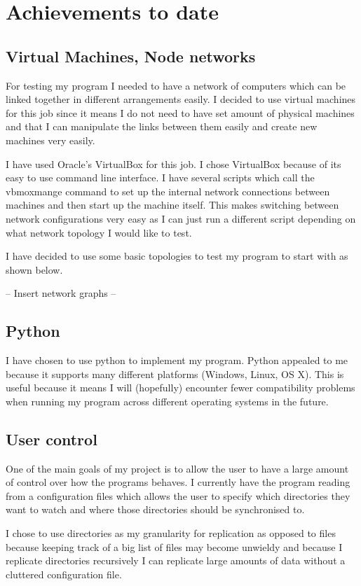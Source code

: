 \documentclass[12pt]{article}
\begin{document}
\section{Achievements to date}
\subsection{Virtual Machines, Node networks}
For testing my program I needed to have a network
of computers which can be linked together in different
arrangements easily. I decided to use virtual machines for
this job since it means I do not need to have set amount
of physical machines and that I can manipulate the
links between them easily and create new machines very easily. 

I have used Oracle's VirtualBox for this job. I chose
VirtualBox because of its easy to use command
line interface. I have several scripts which
call the vbmoxmange command to set up the internal
network connections between machines and then start up
the machine itself. This makes switching between
network configurations very easy as I can just
run a different script depending on what network
topology I would like to test.

I have decided to use some basic topologies to
test my program to start with as shown below.

-- Insert network graphs --

\subsection{Python}
I have chosen to use python to implement
my program. Python appealed to me because it
supports many different platforms (Windows, Linux, OS X).
This is useful because it means I will (hopefully)
encounter fewer compatibility problems when running
my program across different operating systems in the future.


\subsection{User control}
One of the main goals of my project is to allow the user
to have a  large amount of control over how the programs
behaves. I currently have the program reading from a
configuration files which allows the user to specify
which directories they want to watch and where those
directories should be synchronised to.

I chose to use directories as my granularity for replication
as opposed to files because keeping track of a big list
of files may become unwieldy and because I replicate
directories recursively I can replicate large amounts
of data without a cluttered configuration file.
\end{document}
